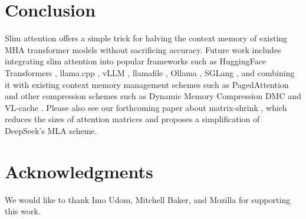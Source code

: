 \documentclass{article}
\begin{document}



\section{Conclusion}
Slim attention offers a simple trick for halving the context memory of existing MHA transformer models without sacrificing accuracy. Future work includes integrating slim attention into popular frameworks such as HuggingFace Transformers \citep{HFtransformers}, llama.cpp \citep{llama-cpp},  vLLM \citep{vLLM}, llamafile \citep{llamafile}, Ollama \citep{ollama}, SGLang \citep{sglang}, and combining it with existing context memory management schemes such as PagedAttention \citep{pagedAttn} and other compression schemes such as Dynamic Memory Compression DMC \citep{DMC} and VL-cache \citep{VL-cache}.
Please also see our forthcoming paper about matrix-shrink \citep{matShrink}, which reduces the sizes of attention matrices and proposes a simplification of DeepSeek's MLA scheme.

\section*{Acknowledgments}
We would like to thank Imo Udom, Mitchell Baker, and Mozilla for supporting this work.



\end{document}
